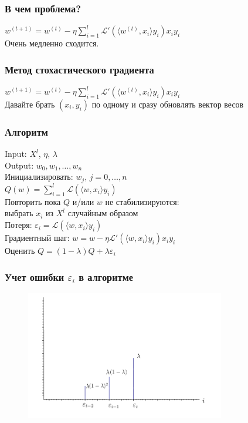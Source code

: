 \documentclass[12pt]{beamer}
\begin{document}
\begin{frame}\frametitle{В чем проблема?}
$w^{(t+1)} =  w^{(t)} - \eta \sum\limits_{i=1}^l \mathcal{L}'(\langle w^{(t)}, x_i\rangle y_i)x_iy_i$\\
\vspace{5mm}
Очень медленно сходится.
\end{frame}

\begin{frame}\frametitle{Метод стохастического градиента}
$w^{(t+1)} =  w^{(t)} - \eta \sum\limits_{i=1}^l \mathcal{L}'(\langle w^{(t)}, x_i\rangle y_i)x_iy_i$\\
\vspace{5mm}
Давайте брать $(x_i, y_i)$ по одному и сразу обновлять вектор весов
\end{frame}


\begin{frame}\frametitle{Алгоритм}
Input: $X^l$, $\eta$, $\lambda$\\
Output: $w_0, w_1, \dots, w_n$\\
\vspace{3mm}
Инициализировать: $w_j$, $j=0,\dots, n$\\
\hspace{35mm} ${Q}(w) = \sum\limits_{i=1}^l \mathcal{L}(\langle w, x_i \rangle y_i)$\\
Повторить пока $Q$ и/или $w$ не стабилизируются:\\
\hspace{5mm} выбрать $x_i$ из $X^l$ случайным образом\\
\hspace{5mm} Потеря: $\varepsilon_i = \mathcal{L}(\langle w, x_i \rangle y_i)$\\
\hspace{5mm} Градиентный шаг: $w =  w - \eta \mathcal{L}'(\langle w, x_i\rangle y_i)x_iy_i$\\
\hspace{5mm} Оценить $Q = (1-\lambda)Q + \lambda \varepsilon_i$
\end{frame}


\begin{frame}\frametitle{Учет ошибки $\varepsilon_i$ в алгоритме}
\begin{figure}[htbp]
  \includegraphics[height=160pt, keepaspectratio = true]{images/l2}   
\end{figure}
\end{frame}
\end{document}

